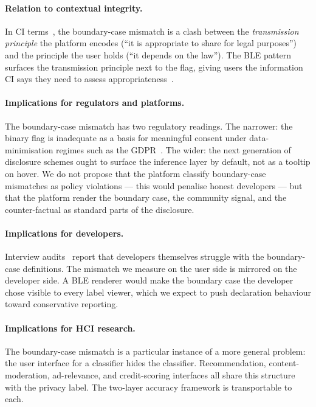 \documentclass[11pt,a4paper]{article}
\begin{document}
\paragraph{Relation to contextual integrity.}
In CI terms~\citep{nissenbaum:2004,nissenbaum:2010,barth:etal:2006},
the boundary-case mismatch is a clash between the
\emph{transmission principle} the platform encodes (``it is
appropriate to share for legal purposes'') and the principle the
user holds (``it depends on the law''). The BLE pattern surfaces the
transmission principle next to the flag, giving users the
information CI says they need to assess
appropriateness~\citep{shvartzshnaider:etal:2019,apthorpe:etal:2018,
martin:nissenbaum:2017}.

\paragraph{Implications for regulators and platforms.}
The boundary-case mismatch has two regulatory readings. The
narrower: the binary flag is inadequate as a basis for meaningful
consent under data-minimisation regimes such as the
GDPR~\citep{gdpr:2016}. The wider: the next generation of disclosure
schemes ought to surface the inference layer by default, not as a
tooltip on hover. We do not propose that the platform classify
boundary-case mismatches as policy violations --- this would penalise
honest developers --- but that the platform render the boundary case,
the community signal, and the counter-factual as standard parts of
the disclosure.

\paragraph{Implications for developers.}
Interview audits~\citep{bhagavatula:etal:2023,khandelwal:etal:2023,
li:etal:2022} report that developers themselves struggle with the
boundary-case definitions. The mismatch we measure on the user side
is mirrored on the developer side. A BLE renderer would make the
boundary case the developer chose visible to every label viewer,
which we expect to push declaration behaviour toward conservative
reporting.

\paragraph{Implications for HCI research.}
The boundary-case mismatch is a particular instance of a more
general problem: the user interface for a classifier hides the
classifier. Recommendation, content-moderation, ad-relevance, and
credit-scoring interfaces all share this structure with the privacy
label. The two-layer accuracy framework is transportable to each.
\end{document}
